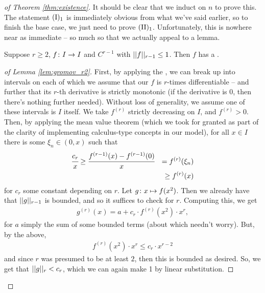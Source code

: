 \begin{proof}[of Theorem \ref{thm:existence}]
  It should be clear that we induct on $n$ to prove this. The statement $\In[1]$ is immediately obvious from what we've said earlier, so to finish the base case, we just need to prove $\IIn[1]$. Unfortunately, this is nowhere near as immediate -- so much so that we actually appeal to a lemma.

    \begin{lemma}[Gromov]
      Suppose $r \geq 2$, $\funcdom{f}{I}{I}$  and $C^{r-1}$ with $\rnorm[r-1]{f} \leq 1$. Then $f$ has a \cellrparam.
      \label{lem:gromov_r2}
    \end{lemma}

    \begin{proof}[of Lemma \ref{lem:gromov_r2}]
      First, by applying the \SMt, we can break up into intervals on each of which we assume that our $f$ is $r$-times differentiable -- and further that its $r$-th derivative is strictly monotonic (if the derivative is 0, then there's nothing further needed). Without loss of generality, we assume one of these intervals is $I$ itself. We take $f^{(r)}$ strictly decreasing on $I$, and $f^{(r)} > 0$. Then, by applying the mean value theorem (which we took for granted as part of the clarity of implementing calculus-type concepts in our model), for all $x \in I$ there is some $\xi_n \in (0, x)$ such that
         \begin{align*}
            \cfrac{c_r}{x} &\geq \cfrac{f^{(r-1)}(x) - f^{(r-1)}(0)}{x} & = f^{(r)}(\xi_n) \\
            & &\geq f^{(r)}(x)
          \end{align*}
        for $c_r$ some constant depending on $r$. Let $\funcdef{g}{x}{f(x^2)}$. Then we already have that $\rnorm[r-1]{g}$ is bounded, and so it suffices to check for $r$. Computing this, we get
          \begin{align*}
            g^{(r)}(x) = a + c_r \cdot f^{(r)}(x^2) \cdot x^r,
          \end{align*}
        for $a$ simply the sum of some bounded terms (about which needn't worry). But, by the above,
          \begin{align*}
            f^{(r)}(x^2) \cdot x^r \leq c_r \cdot x^{r - 2}
          \end{align*}
          and since $r$ was presumed to be at least $2$, then this is bounded as desired. So, we get that $\rnorm{g} < c_r$, which we can again make 1 by linear substitution.
    \end{proof}


\end{proof}
